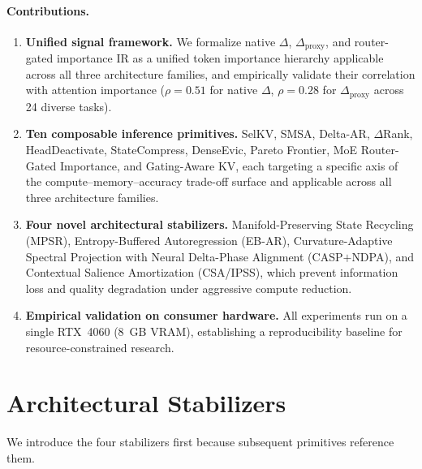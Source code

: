 \documentclass[11pt]{article}
\newcommand{\dsig}{\Delta}
\newcommand{\ir}{\mathrm{IR}}
\newcommand{\proxydsig}{\ensuremath{\dsig_{\mathrm{proxy}}}}
\begin{document}
\paragraph{Contributions.}
\begin{enumerate}[leftmargin=1.4em,itemsep=2pt,topsep=2pt]
  \item \textbf{Unified signal framework.} We formalize native $\dsig$,
    $\proxydsig$, and router-gated importance $\ir$ as a unified token
    importance hierarchy applicable across all three architecture families,
    and empirically validate their correlation with attention importance
    ($\rho{=}0.51$ for native $\dsig$, $\rho{=}0.28$ for $\proxydsig$
    across 24 diverse tasks).
  \item \textbf{Ten composable inference primitives.} SelKV, SMSA, Delta-AR,
    $\dsig$Rank, HeadDeactivate, StateCompress, DenseEvic, Pareto Frontier,
    MoE Router-Gated Importance, and Gating-Aware KV, each targeting a
    specific axis of the compute--memory--accuracy trade-off surface and
    applicable across all three architecture families.
  \item \textbf{Four novel architectural stabilizers.}
    Manifold-Preserving State Recycling (MPSR), Entropy-Buffered
    Autoregression (EB-AR), Curvature-Adaptive Spectral Projection with
    Neural Delta-Phase Alignment (CASP$+$NDPA), and Contextual Salience
    Amortization (CSA/IPSS), which prevent information loss and quality
    degradation under aggressive compute reduction.
  \item \textbf{Empirical validation on consumer hardware.} All experiments
    run on a single RTX~4060 (8~GB VRAM), establishing a reproducibility
    baseline for resource-constrained research.
\end{enumerate}

\section{Architectural Stabilizers}
\label{sec:stab}
We introduce the four stabilizers first because subsequent primitives
reference them.
\end{document}

